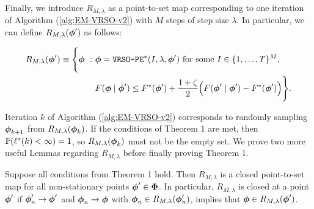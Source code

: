 Finally, we introduce $R_{M,\lambda}$ as a point-to-set map corresponding to one iteration of Algorithm (\ref{alg:EM-VRSO-v2}) with $M$ steps of step size $\lambda$. In particular, we can define $R_{M,\lambda}(\boldsymbol{\phi}')$ as follows:

\begin{align}
    R_{M,\lambda}(\boldsymbol{\phi}') \equiv \Bigg\{\boldsymbol{\phi} ~ : ~ & \boldsymbol{\phi} = \texttt{VRSO-PE}^*(I,\lambda,\boldsymbol{\phi}') ~ \text{for some} ~ I \in \{1,\ldots,T\}^M, \nonumber \\
    & F(\boldsymbol{\phi} \mid \boldsymbol{\phi}') \leq F^*(\boldsymbol{\phi}') + \frac{1 + \zeta}{2} \Big(F(\boldsymbol{\phi}' \mid \boldsymbol{\phi}') - F^*(\boldsymbol{\phi}') \Big)\Bigg\}.
\end{align}

Iteration $k$ of Algorithm (\ref{alg:EM-VRSO-v2}) corresponds to randomly sampling $\boldsymbol{\phi}_{k+1}$ from $R_{M,\lambda}(\boldsymbol{\phi}_k)$. If the conditions of Theorem 1 are met, then $\mathbb{P}(\ell^*(k) < \infty) = 1$, so $R_{M,\lambda}(\boldsymbol{\phi}_k)$ must not be the empty set. We prove two more useful Lemmas regarding $R_{M,\lambda}$ before finally proving Theorem 1.

\begin{lemma}
    Suppose all conditions from Theorem 1 hold. Then $R_{M,\lambda}$ is a closed point-to-set map for all non-stationary points $\boldsymbol{\phi}' \in \boldsymbol{\Phi}$. In particular, $R_{M,\lambda}$ is closed at a point $\boldsymbol{\phi}'$ if $\boldsymbol{\phi}'_{n} \to \boldsymbol{\phi}'$ and $\boldsymbol{\phi}_{n} \to \boldsymbol{\phi}$ with $\boldsymbol{\phi}_{n} \in R_{M,\lambda}(\boldsymbol{\phi}'_{n})$, implies that $\boldsymbol{\phi} \in R_{M,\lambda}(\boldsymbol{\phi}')$. 
\end{lemma}

